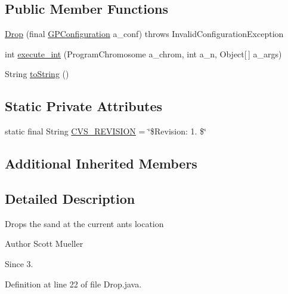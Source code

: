 \subsection*{Public Member Functions}
\begin{DoxyCompactItemize}
\item 
\hyperlink{classexamples_1_1gp_1_1painted_desert_1_1_drop_a2a24d7ec41d9ea0b3a28921b3679352b}{Drop} (final \hyperlink{classorg_1_1jgap_1_1gp_1_1impl_1_1_g_p_configuration}{G\-P\-Configuration} a\-\_\-conf)  throws Invalid\-Configuration\-Exception 
\item 
int \hyperlink{classexamples_1_1gp_1_1painted_desert_1_1_drop_aedad5579b46ecd2f5b48882c40b19551}{execute\-\_\-int} (Program\-Chromosome a\-\_\-chrom, int a\-\_\-n, Object\mbox{[}$\,$\mbox{]} a\-\_\-args)
\item 
String \hyperlink{classexamples_1_1gp_1_1painted_desert_1_1_drop_a989bcc25a0bc11134d7b10bea69bc1f5}{to\-String} ()
\end{DoxyCompactItemize}
\subsection*{Static Private Attributes}
\begin{DoxyCompactItemize}
\item 
static final String \hyperlink{classexamples_1_1gp_1_1painted_desert_1_1_drop_acb81bd786b9f3c616d94ef2e7bec63dd}{C\-V\-S\-\_\-\-R\-E\-V\-I\-S\-I\-O\-N} = \char`\"{}\$Revision\-: 1. \$\char`\"{}
\end{DoxyCompactItemize}
\subsection*{Additional Inherited Members}


\subsection{Detailed Description}
Drops the sand at the current ants location

\begin{DoxyAuthor}{Author}
Scott Mueller 
\end{DoxyAuthor}
\begin{DoxySince}{Since}
3. 
\end{DoxySince}


Definition at line 22 of file Drop.\-java.



